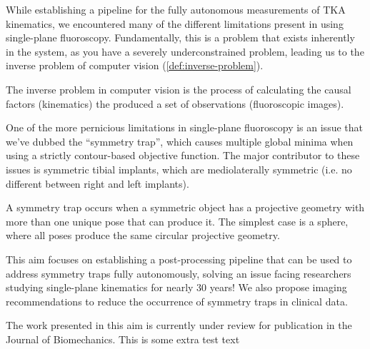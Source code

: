 While establishing a pipeline for the fully autonomous measurements of TKA kinematics, we encountered many of the different limitations present in using single-plane fluoroscopy. Fundamentally, this is a problem that exists inherently in the system, as you have a severely underconstrained problem, leading us to the inverse problem of computer vision (\cref{def:inverse-problem}).

\begin{mdframed}
    \begin{definition}
        The inverse problem in computer vision is the process of calculating the causal factors (kinematics) the produced a set of observations (fluoroscopic images).
        \label{def:inverse-problem}
    \end{definition}
\end{mdframed}

One of the more pernicious limitations in single-plane fluoroscopy is an issue that we've dubbed the ``symmetry trap'', which causes multiple global minima when using a strictly contour-based objective function. The major contributor to these issues is symmetric tibial implants, which are mediolaterally symmetric (i.e. no different between right and left implants).

\begin{mdframed}
    \begin{definition}
        A symmetry trap occurs when a symmetric object has a projective geometry with more than one unique pose that can produce it. The simplest case is a sphere, where all poses produce the same circular projective geometry.
    \end{definition}
\end{mdframed}

This aim focuses on establishing a post-processing pipeline that can be used to address symmetry traps fully autonomously, solving an issue facing researchers studying single-plane kinematics for nearly 30 years! We also propose imaging recommendations to reduce the occurrence of symmetry traps in clinical data.

The work presented in this aim is currently under review for publication in the Journal of Biomechanics. This is some extra test text


